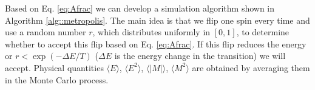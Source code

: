 Based on Eq. \ref{eq:Afrac} we can develop a simulation algorithm shown in Algorithm \ref{alg::metropolis}. 
The main idea is that we flip one spin every time and use a random number $r$, which distributes uniformly in $[0,1]$, to determine whether to accept this flip based on Eq. \ref{eq:Afrac}. 
If this flip reduces the energy or $r<\exp\left(-\Delta E/T\right)$ ($\Delta E$ is the energy change in the transition) we will accept. 
Physical quantities $\langle E \rangle$, $\langle E^2 \rangle$, $\langle |M| \rangle$, $\langle M^2 \rangle$ 
are obtained by averaging them in the Monte Carlo process. 
